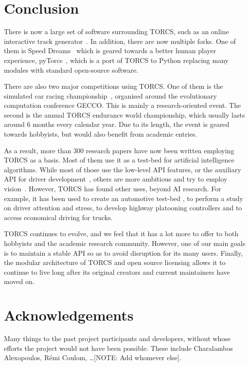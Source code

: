 \documentclass[a4paper]{article}
\begin{document}
\section{Conclusion}

There is now a large set of software surrounding TORCS, such as an online interactive track generator~\cite{cardamone2011interactive}. In addition, there are now multiple forks. One of them is Speed Dreams~\cite{speed-dreams} which is geared towards a better human player experience, pyTorcs~\cite{pytorcs}, which is a port of TORCS to Python replacing many modules  with standard open-source software.

There are also two major competitions using TORCS. One of them is the simulated car racing championship~\cite{car-racing}, organised around the evolutionary computation conference GECCO. This is mainly a research-oriented event. The second is the annual TORCS endurance world championship\cite{torcs-endurance}, which usually lasts around 6 months every calendar year. Due to its length, the event is geared towards hobbyists, but would also benefit from academic entries.

As a result, more than 300 research papers have now been written employing TORCS as a basis. Most of them use it as a test-bed for artificial intelligence algorithms. While most of those use the low-level API features, or the auxiliary API for driver development~\cite{caldeiratorcs}, others are more ambitious and try to employ vision~\cite{koutnikevolving,tran2010towards}. 
However, TORCS has found other uses, beyond AI research. For example, it has been used to create an automotive test-bed \cite{drolia2011autoplug}, to perform a study on driver attention and stress\cite{benoit2009multimodal}, to develop highway platooning controllers and to access economical driving for trucks\cite{bogoni2012use}.

TORCS continues to evolve, and we feel that it has a lot more to offer to both hobbyists and the academic research community. However, one of our main goals is to maintain a stable API so as to avoid disruption for its many users. Finally, the modular architecture of TORCS and open source licensing allows it to continue to live long after its original creators and current maintainers have moved on. 

\section*{Acknowledgements}
Many things to the past project participants and developers, without whose efforts the project would not have been possible. These include Charalambos Alexopoulos, R\'emi Coulom, \ldots [NOTE: Add whomever else].



\end{document}
